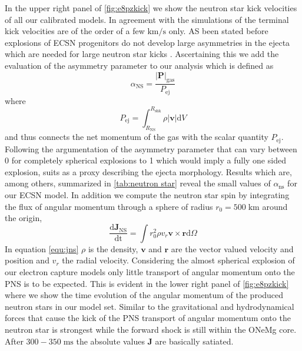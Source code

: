 \documentclass[fleqn,usenatbib]{mnras}
\newcommand{\ud}{\ensuremath{\mathrm{d}}}
\begin{document}
In the upper right panel of \autoref{fig:e8pzkick} we show the neutron star kick velocities of all our calibrated models. In agreement with the simulations of \cite{Gessner2018} the terminal kick velocities are of the order of a few $\mathrm{km/s}$ only. AS been stated before explosions of ECSN progenitors do not develop large asymmetries in the ejecta which are needed for large neutron star kicks \cite{Scheck2006a}. Ascertaining this we add the evaluation of the asymmetry parameter to our analysis which is defined as 
\begin{equation}
    \alpha_{\mathrm{NS}} = \frac{|\mathbf{P}|_{\mathrm{gas}}}{P_{\mathrm{ej}}}
\end{equation}
where 
\begin{equation}
P_{\mathrm{ej}}=\int_{R_{\mathrm{NS}}}^{R_{\mathrm{shk}}}\rho |\mathbf{v}| \ud V
\end{equation}
and thus connects the net momentum of the gas with the scalar quantity $P_{\mathrm{ej}}$. Following the argumentation of \cite{Gessner2018} the asymmetry parameter that can vary between 0 for completely spherical explosions to 1 which would imply a fully one sided explosion, suits as a proxy describing the ejecta morphology. Results which are, among others, summarized in \autoref{tab:neutron star} reveal the small values of $\alpha_{\mathrm{ns}}$ for our ECSN model.
In addition we compute the neutron star spin by integrating the flux of angular momentum through a sphere of radius $r_{0}=500\;\mathrm{km}$ around the origin,
\begin{equation}
\label{equ:jns}
\frac{\mathrm{d}\mathbf{J}_{\mathrm{NS}}}{\mathrm{dt}} = \int r_0^2 \rho v_r \mathbf{v}\times \mathbf{r} \mathrm{d}\Omega
\end{equation}
In equation \ref{equ:jns} $\rho$ is the density, $\mathbf{v}$ and $\mathbf{r}$ are the vector valued velocity and position and $v_r$ the radial velocity. Considering the almost spherical explosion of our electron capture models only little transport of angular momentum onto the PNS is to be expected. This is evident in the lower right panel of \autoref{fig:e8pzkick} where we show the time evolution of the angular momentum of the produced neutron stars in our model set. Similar to the gravitational and hydrodynamical forces that cause the kick of the PNS transport of angular momentum onto the neutron star is strongest while the forward shock is still within the ONeMg core. After $300-350\;\mathrm{ms}$ the absolute values $\mathbf{J}$ are basically satiated.
\end{document}
